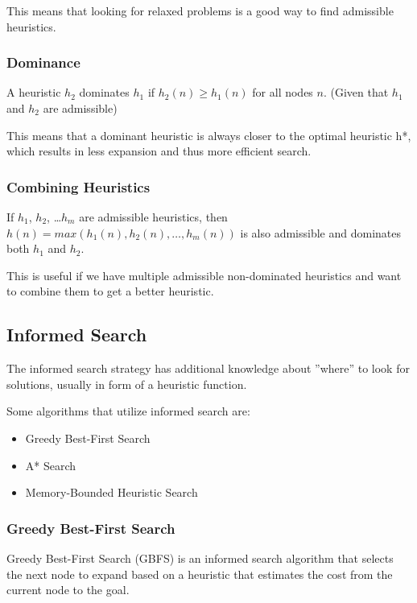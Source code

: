 \documentclass[
../EiKI_Summary.tex,
]
{subfiles}
\begin{document}
This means that looking for relaxed problems is a good way to find admissible heuristics.

\subsubsection{Dominance}
\begin{defbox*}
    A heuristic $h_2$ dominates $h_1$ if $h_2(n) \geq h_1(n)$ for all nodes $n$. (Given that $h_1$ and $h_2$ are admissible)
\end{defbox*}

This means that a dominant heuristic is always closer to the optimal heuristic h*, which results in less expansion and thus more efficient search.

\subsubsection{Combining Heuristics}
\begin{defbox*}
    If $h_1$, $h_2$, \dots $h_m$ are admissible heuristics, then $h(n) = max(h_1(n), h_2(n),\dots,  h_m(n))$ is also admissible and dominates both $h_1$ and $h_2$.
\end{defbox*}

This is useful if we have multiple admissible non-dominated heuristics and want to combine them to get a better heuristic. 

\subsection{Informed Search}
\begin{defbox}
    [Definition]
    The informed search strategy has additional knowledge about ''where'' to look for solutions, usually in form of a heuristic function.

    Some algorithms that utilize informed search are:
    \begin{itemize}
        \item Greedy Best-First Search
        \item A* Search
        \item Memory-Bounded Heuristic Search
    \end{itemize}
\end{defbox}


\subsubsection{Greedy Best-First Search}
Greedy Best-First Search (GBFS) is an informed search algorithm that selects the next node to expand based on a heuristic that estimates the cost from the current node to the goal. 
\end{document}
